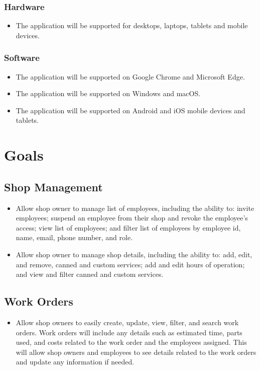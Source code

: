 \documentclass{article}
\begin{document}
\subsubsection{Hardware}
\begin{itemize}
	\item The application will be supported for desktops, laptops, tablets and mobile devices.
\end{itemize}
\subsubsection{Software}
\begin{itemize}
	\item The application will be supported on Google Chrome and Microsoft Edge.
	\item The application will be supported on Windows and macOS.
	\item The application will be supported on Android and iOS mobile devices and tablets.
\end{itemize}

\section{Goals}
\subsection{Shop Management}
\begin{itemize}
	\item Allow shop owner to manage list of employees, including the ability to: invite employees; suspend
	      an employee from their shop and revoke the employee's access; view list of employees; and filter
	      list of employees by employee id, name, email, phone number, and role.
	\item Allow shop owner to manage shop details, including the ability to: add, edit, and remove, canned
	      and custom services; add and edit hours of operation; and view and filter canned and custom
	      services.
\end{itemize}

\subsection{Work Orders}
\begin{itemize}
	\item Allow shop owners to easily create, update, view, filter, and search work orders. Work orders will
	      include any details such as estimated time, parts used, and costs related to the work order and the
	      employees assigned. This will allow shop owners and employees to see details related to the work
	      orders and update any information if needed.
\end{itemize}
\end{document}
